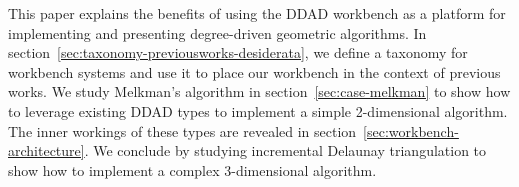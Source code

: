 This paper explains the benefits of using the DDAD workbench as a platform for
implementing and presenting degree-driven geometric algorithms. In
section~\ref{sec:taxonomy-previousworks-desiderata}, we define a taxonomy for
workbench systems and use it to place our workbench in the context of previous
works. We study Melkman's algorithm in section~\ref{sec:case-melkman} to show
how to leverage existing DDAD types to implement a simple 2-dimensional
algorithm. The inner workings of these types are revealed in
section~\ref{sec:workbench-architecture}. We conclude by studying incremental
Delaunay triangulation to show how to implement a complex 3-dimensional
algorithm.



